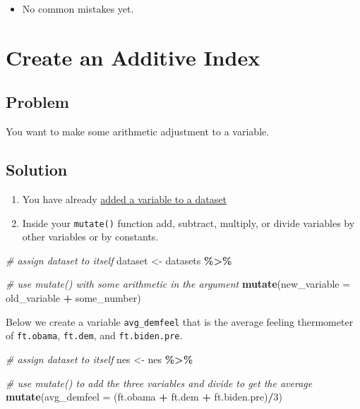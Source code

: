\documentclass[
]{book}
\newenvironment{Shaded}{\begin{snugshade}}{\end{snugshade}}
\newcommand{\AttributeTok}[1]{\textcolor[rgb]{0.13,0.29,0.53}{#1}}
\newcommand{\CommentTok}[1]{\textcolor[rgb]{0.56,0.35,0.01}{\textit{#1}}}
\newcommand{\DecValTok}[1]{\textcolor[rgb]{0.00,0.00,0.81}{#1}}
\newcommand{\FunctionTok}[1]{\textcolor[rgb]{0.13,0.29,0.53}{\textbf{#1}}}
\newcommand{\NormalTok}[1]{#1}
\newcommand{\OtherTok}[1]{\textcolor[rgb]{0.56,0.35,0.01}{#1}}
\newcommand{\SpecialCharTok}[1]{\textcolor[rgb]{0.81,0.36,0.00}{\textbf{#1}}}
\providecommand{\tightlist}{%
  \setlength{\itemsep}{0pt}\setlength{\parskip}{0pt}}
\begin{document}
\begin{itemize}
\tightlist
\item
  No common mistakes yet.
\end{itemize}

\hypertarget{additive}{%
\section{Create an Additive Index}\label{additive}}

\hypertarget{problem-16}{%
\subsection{Problem}\label{problem-16}}

You want to make some arithmetic adjustment to a variable.

\hypertarget{solution-15}{%
\subsection{Solution}\label{solution-15}}

\begin{enumerate}
\def\labelenumi{\arabic{enumi}.}
\tightlist
\item
  You have already \protect\hyperlink{add-variable}{added a variable to a dataset}
\item
  Inside your \texttt{mutate()} function add, subtract, multiply, or divide variables by other variables or by constants.
\end{enumerate}

\begin{Shaded}
\begin{Highlighting}[]
\CommentTok{\# assign dataset to itself}
\NormalTok{dataset }\OtherTok{\textless{}{-}}\NormalTok{ datasets }\SpecialCharTok{\%\textgreater{}\%}
  
  \CommentTok{\# use mutate() with some arithmetic in the argument}
  \FunctionTok{mutate}\NormalTok{(}\AttributeTok{new\_variable =}\NormalTok{ old\_variable }\SpecialCharTok{+}\NormalTok{ some\_number)}
\end{Highlighting}
\end{Shaded}

Below we create a variable \texttt{avg\_demfeel} that is the average feeling thermometer of \texttt{ft.obama}, \texttt{ft.dem}, and \texttt{ft.biden.pre}.

\begin{Shaded}
\begin{Highlighting}[]
\CommentTok{\# assign dataset to itself}
\NormalTok{nes }\OtherTok{\textless{}{-}}\NormalTok{ nes }\SpecialCharTok{\%\textgreater{}\%}
  
  \CommentTok{\# use mutate() to add the three variables and divide to get the average}
  \FunctionTok{mutate}\NormalTok{(}\AttributeTok{avg\_demfeel =}\NormalTok{ (ft.obama }\SpecialCharTok{+}\NormalTok{ ft.dem }\SpecialCharTok{+}\NormalTok{ ft.biden.pre)}\SpecialCharTok{/}\DecValTok{3}\NormalTok{)}
\end{Highlighting}
\end{Shaded}
\end{document}
